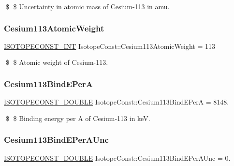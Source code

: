 \$ \$ Uncertainty in atomic mass of Cesium-\/113 in amu. \mbox{\label{group___isotope_const-_cesium-_cs113_ga5324569d03ed30da15412fe8c880331c}} 
\subsubsection{\texorpdfstring{Cesium113\+Atomic\+Weight}{Cesium113AtomicWeight}}
{\footnotesize\ttfamily \mbox{\hyperlink{group___isotope_const-_macros_ga5f18360b3e99483a35c32d789e62621c}{I\+S\+O\+T\+O\+P\+E\+C\+O\+N\+S\+T\+\_\+\+I\+NT}} Isotope\+Const\+::\+Cesium113\+Atomic\+Weight = 113}

\$ \$ Atomic weight of Cesium-\/113. \mbox{\label{group___isotope_const-_cesium-_cs113_gac0184f8296dffd660f332f1e3a9c502b}} 
\subsubsection{\texorpdfstring{Cesium113\+Bind\+E\+PerA}{Cesium113BindEPerA}}
{\footnotesize\ttfamily \mbox{\hyperlink{group___isotope_const-_macros_ga8f45a7272ce02c0b4c65c44636ed719a}{I\+S\+O\+T\+O\+P\+E\+C\+O\+N\+S\+T\+\_\+\+D\+O\+U\+B\+LE}} Isotope\+Const\+::\+Cesium113\+Bind\+E\+PerA = 8148.}

\$ \$ Binding energy per A of Cesium-\/113 in keV. \mbox{\label{group___isotope_const-_cesium-_cs113_ga5ed06cc062b65bcbe0b73b86c7d3cb86}} 
\subsubsection{\texorpdfstring{Cesium113\+Bind\+E\+Per\+A\+Unc}{Cesium113BindEPerAUnc}}
{\footnotesize\ttfamily \mbox{\hyperlink{group___isotope_const-_macros_ga8f45a7272ce02c0b4c65c44636ed719a}{I\+S\+O\+T\+O\+P\+E\+C\+O\+N\+S\+T\+\_\+\+D\+O\+U\+B\+LE}} Isotope\+Const\+::\+Cesium113\+Bind\+E\+Per\+A\+Unc = 0.}


